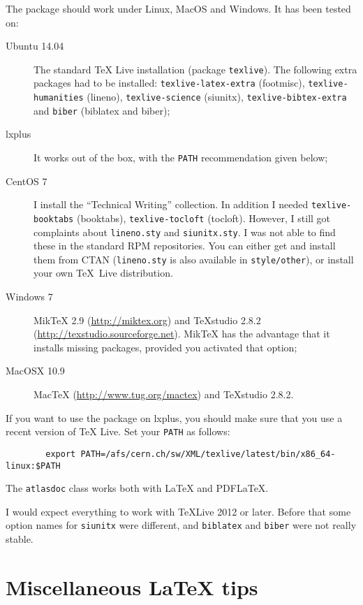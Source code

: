 \documentclass[koma,UKenglish]{style/atlasdoc}
\begin{document}
The package should work under Linux, MacOS and Windows. It has been tested on:
\begin{description}
\item[Ubuntu 14.04]
	The standard TeX Live installation (package \texttt{texlive}).
	The following extra packages had to be installed:
	\texttt{texlive-latex-extra} (footmisc),
	\texttt{texlive-humanities} (lineno),
	\texttt{texlive-science} (siunitx),
	\texttt{texlive-bibtex-extra} and \texttt{biber} (biblatex and biber);
\item[lxplus] It works out of the box, with the \texttt{PATH} recommendation given below;
\item[CentOS 7] I install the ``Technical Writing'' collection.
	In addition I needed \texttt{texlive-booktabs} (booktabs), \texttt{texlive-tocloft} (tocloft).
	However, I still got complaints about \texttt{lineno.sty} and \texttt{siunitx.sty}.
	I was not able to find these in the standard RPM repositories.
	You can either get and install them from CTAN (\texttt{lineno.sty} is also available in \texttt{style/other}),
	or install your own \TeX\ Live distribution.
\item[Windows 7]
	MikTeX 2.9 (\url{http://miktex.org}) and TeXstudio 2.8.2 (\url{http://texstudio.sourceforge.net}).
	MikTeX has the advantage that it installs missing packages, provided you activated that option;
\item[MacOSX 10.9]
	MacTeX (\url{http://www.tug.org/mactex}) and TeXstudio 2.8.2.
\end{description}

If you want to use the package on lxplus, you should make sure that you use a recent version of TeX Live.
Set your \texttt{PATH} as follows:
\begin{verbatim}
		export PATH=/afs/cern.ch/sw/XML/texlive/latest/bin/x86_64-linux:$PATH
\end{verbatim}

The \texttt{atlasdoc} class works both with \LaTeX{} and PDF\LaTeX{}.

I would expect everything to work with TeXLive 2012 or later.
Before that some option names for \texttt{siunitx} were different, and \texttt{biblatex} and \texttt{biber}
were not really stable.


\section{Miscellaneous \LaTeX{} tips}
\label{sec:latex}
\end{document}
